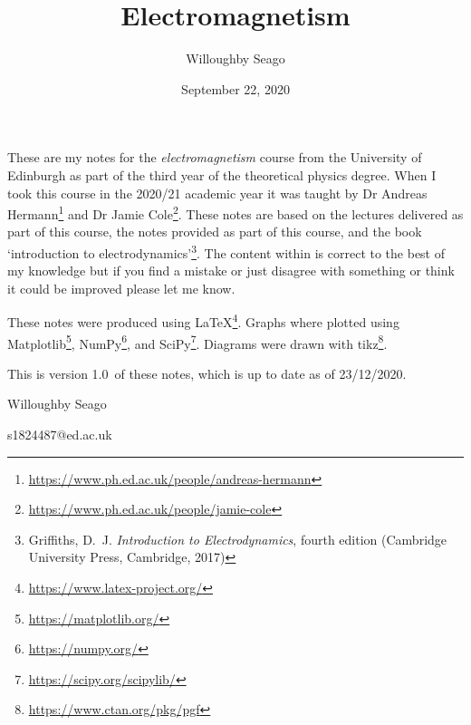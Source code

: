 \documentclass[a4paper]{article}
\author{Willoughby Seago}
\date{September 22, 2020}
\title{Electromagnetism}
\newcommand{\notesVersion}{1.0}
\newcommand{\notesDate}{23/12/2020}
\begin{document}
    \maketitle
    These are my notes for the \textit{electromagnetism} course from the University of Edinburgh as part of the third year of the theoretical physics degree.
    When I took this course in the 2020/21 academic year it was taught by Dr Andreas Hermann\footnote{\url{https://www.ph.ed.ac.uk/people/andreas-hermann}} and Dr Jamie Cole\footnote{\url{https://www.ph.ed.ac.uk/people/jamie-cole}}.
    These notes are based on the lectures delivered as part of this course, the notes provided as part of this course, and the book `introduction to electrodynamics'\footnote{Griffiths, D.~J. \textit{Introduction to Electrodynamics}, fourth edition (Cambridge University Press, Cambridge, 2017)}.
    The content within is correct to the best of my knowledge but if you find a mistake or just disagree with something or think it could be improved please let me know.
    
    These notes were produced using \LaTeX\footnote{\url{https://www.latex-project.org/}}.
    Graphs where plotted using Matplotlib\footnote{\url{https://matplotlib.org/}}, NumPy\footnote{\url{https://numpy.org/}}, and SciPy\footnote{\url{https://scipy.org/scipylib/}}.
    Diagrams were drawn with tikz\footnote{\url{https://www.ctan.org/pkg/pgf}}.
    
    This is version \notesVersion~of these notes, which is up to date as of \notesDate.
    \begin{flushright}
        Willoughby Seago
        
        s1824487@ed.ac.uk
    \end{flushright}
    \clearpage
    \tableofcontents
    \listoffigures
    \printglossary[type=\acronymtype, title=Acronyms, style=long]
    \clearpage
    \begingroup
    \let\clearpage\relax  %
        
        
        
    \endgroup
\end{document}
